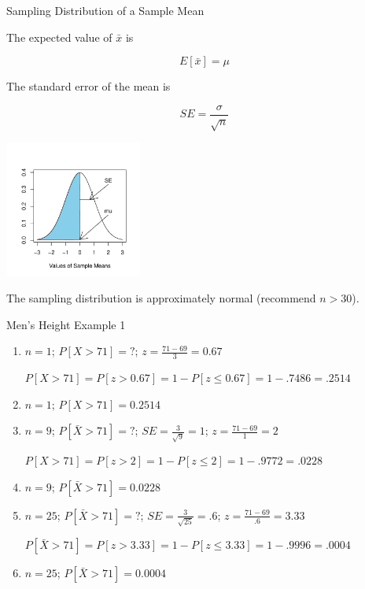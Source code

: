 \documentclass[14pt]{beamer}\usepackage[]{graphicx}\usepackage[]{color}
\begin{document}
\begin{frame}[fragile]{Sampling Distribution of a Sample Mean}

\begin{minipage}[ht]{5cm}

{\small{
The expected value of $\bar{x}$ is 
}}

$$ E[\bar{x}] = \mu $$

{\footnotesize{
The standard error of the mean is
}}

$$ SE = \frac{ \sigma}{ \sqrt{n}} $$

\end{minipage} \hfill
\begin{minipage}[ht]{5cm}


\includegraphics[width=4.5cm]{figure/LBL10d-1} 


\end{minipage}

The sampling distribution is approximately normal (recommend $n > 30$). 

\end{frame}

\begin{frame}[fragile]{Men's Height Example 1}

\begin{enumerate}[a]
\item<1-> $n = 1$; $P[X > 71] =?$; $z = \frac{71 - 69}{3} = 0.67$

{\footnotesize{
$P[ X > 71] = P[ z > 0.67] = 1 - P[ z \le 0.67] = 1 - .7486 = .2514$
}}
\item<2-> $n = 1$; $P[X > 71] = 0.2514 $
\item<3-> $n = 9$; $P[\bar{X} > 71] =?$; $SE = \frac{3}{\sqrt{9}} = 1$;  $z =  \frac{71 - 69}{1} = 2$

{\footnotesize{
$P[ X > 71] = P[ z > 2] = 1 - P[ z \le 2] = 1 - .9772 = .0228$
}}
\item<4-> $n = 9$; $P[\bar{X} > 71] =  0.0228 $
\item<5-> $n = 25$; $P[\bar{X} > 71] =?$; $SE = \frac{3}{\sqrt{25}} = .6$;  $z =  \frac{71 - 69}{.6} = 3.33$

{\footnotesize{
$P[ \bar{X} > 71] = P[ z > 3.33] = 1 - P[ z \le 3.33] = 1 - .9996 = .0004$
}}
\item<6-> $n = 25$; $P[\bar{X} > 71] =  0.0004 $

\end{enumerate}
\end{frame}
\end{document}
